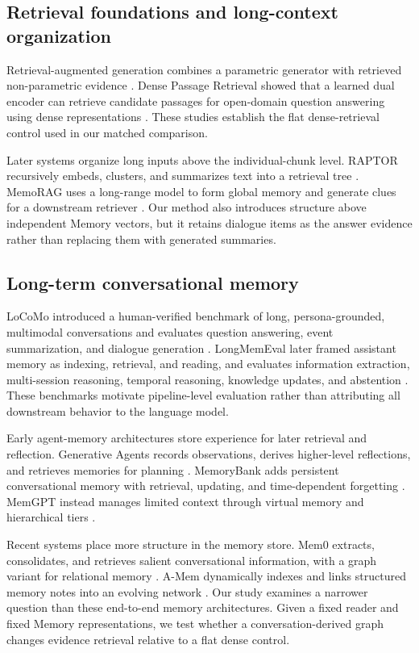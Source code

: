 \documentclass[10pt,twocolumn]{article}
\begin{document}
\subsection{Retrieval foundations and long-context organization}

Retrieval-augmented generation combines a parametric generator with retrieved
non-parametric evidence \citep{lewis2020rag}. Dense Passage Retrieval showed
that a learned dual encoder can retrieve candidate passages for open-domain
question answering using dense representations
\citep{karpukhin2020dpr}. These studies establish the flat dense-retrieval
control used in our matched comparison.

Later systems organize long inputs above the individual-chunk level. RAPTOR
recursively embeds, clusters, and summarizes text into a retrieval tree
\citep{sarthi2024raptor}. MemoRAG uses a long-range model to form global memory
and generate clues for a downstream retriever \citep{qian2024memorag}. Our
method also introduces structure above independent Memory vectors, but it
retains dialogue items as the answer evidence rather than replacing them with
generated summaries.

\subsection{Long-term conversational memory}

LoCoMo introduced a human-verified benchmark of long, persona-grounded,
multimodal conversations and evaluates question answering, event
summarization, and dialogue generation \citep{maharana2024locomo}.
LongMemEval later framed assistant memory as indexing, retrieval, and reading,
and evaluates information extraction, multi-session reasoning, temporal
reasoning, knowledge updates, and abstention \citep{wu2025longmemeval}. These
benchmarks motivate pipeline-level evaluation rather than attributing all
downstream behavior to the language model.

Early agent-memory architectures store experience for later retrieval and
reflection. Generative Agents records observations, derives higher-level
reflections, and retrieves memories for planning
\citep{park2023generative}. MemoryBank adds persistent conversational memory
with retrieval, updating, and time-dependent forgetting
\citep{zhong2024memorybank}. MemGPT instead manages limited context through
virtual memory and hierarchical tiers \citep{packer2023memgpt}.

Recent systems place more structure in the memory store. Mem0 extracts,
consolidates, and retrieves salient conversational information, with a graph
variant for relational memory \citep{chhikara2025mem0}. A-Mem dynamically
indexes and links structured memory notes into an evolving network
\citep{xu2025amem}. Our study examines a narrower question than these
end-to-end memory architectures. Given a fixed reader and fixed Memory
representations, we test whether a conversation-derived graph changes evidence
retrieval relative to a flat dense control.
\end{document}
